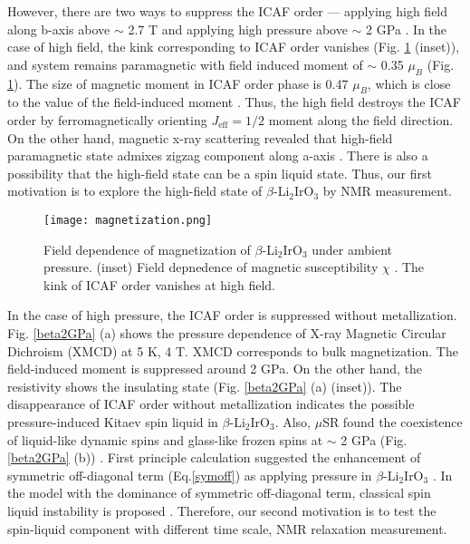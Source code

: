 However, there are two ways to suppress the ICAF order --- applying high field along b-axis above $\sim$ 2.7 T
and applying high pressure above $\sim$ 2 GPa \cite{takayama2015hyperhoneycomb}.
In the case of high field, the kink corresponding to ICAF order vanishes (Fig. \ref{Bdep_mag} (inset)),
and system remains paramagnetic with field induced moment of $\sim$ 0.35 $\mu_B$ (Fig. \ref{Bdep_mag}).
The size of magnetic moment in ICAF order phase is 0.47 $\mu_B$, which is close to the value of the field-induced moment \cite{Biffin2014}.
Thus, the high field destroys the ICAF order by ferromagnetically orienting $J_{\mathrm{eff}} = 1/2$ moment along the field direction.
On the other hand, magnetic x-ray scattering revealed that high-field paramagnetic state admixes zigzag component along a-axis \cite{ruiz2017correlated}.
There is also a possibility that the high-field state can be a spin liquid state.
Thus, our first motivation is to explore the high-field state of $\beta$-Li$_2$IrO$_3$ by NMR measurement.

\begin{figure}
  \centering
  \texttt{[image: magnetization.png]}
  \caption{Field dependence of magnetization of $\beta$-Li$_2$IrO$_3$ under ambient pressure.
  (inset) Field depnedence of magnetic susceptibility $\chi$ \cite{takayama2015hyperhoneycomb}.
  The kink of ICAF order vanishes at high field.}
  \label{Bdep_mag}
\end{figure}

In the case of high pressure, the ICAF order is suppressed without metallization.
Fig. \ref{beta2GPa} (a) shows the pressure dependence of X-ray Magnetic Circular Dichroism (XMCD) at 5 K, 4 T.
XMCD corresponds to bulk magnetization.
The field-induced moment is suppressed around 2 GPa.
On the other hand, the resistivity shows the insulating state (Fig. \ref{beta2GPa} (a) (inset)).
The disappearance of ICAF order without metallization indicates the possible pressure-induced Kitaev spin liquid in $\beta$-Li$_2$IrO$_3$.
Also, $\mu$SR found the coexistence of liquid-like dynamic spins and glass-like frozen spins at $\sim$ 2 GPa (Fig. \ref{beta2GPa} (b)) \cite{Majumder2018}.
First principle calculation suggested the enhancement of symmetric off-diagonal term (Eq.\ref{symoff}) as applying pressure in $\beta$-Li$_2$IrO$_3$ \cite{Yadav2018, Kim2016}.
In the model with the dominance of symmetric off-diagonal term, classical spin liquid instability is proposed \cite{Rousochatzakis2017}.
Therefore, our second motivation is to test the spin-liquid component with different time scale, NMR relaxation measurement.

